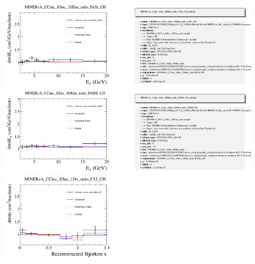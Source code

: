 \documentclass{article}
\begin{document}
\centering
\includegraphics[width=0.49\textwidth]{figures/minerva_numu_ccincratio_enuFe_comp.png}
\includegraphics[width=0.49\textwidth]{figures/minerva_numu_ccincratio_enuFe_info.png}
\centering
\includegraphics[width=0.49\textwidth]{figures/minerva_numu_ccincratio_enuPb_comp.png}
\includegraphics[width=0.49\textwidth]{figures/minerva_numu_ccincratio_enuPb_info.png}
\centering
\includegraphics[width=0.49\textwidth]{figures/minerva_numu_ccincratio_xC_comp.png}
\end{document}

